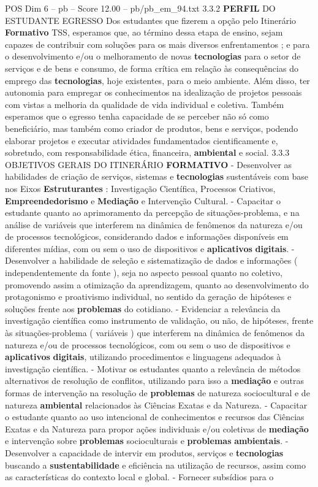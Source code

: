 \begin{textsample}{POS Dim 6 – pb – Score 12.00 – pb/pb\_em\_94.txt}  \label{ex:f6_pos_201}
3.3.2 \textbf{PERFIL} DO ESTUDANTE EGRESSO Dos estudantes que fizerem a opção pelo Itinerário \textbf{Formativo} TSS, esperamos que, ao término dessa etapa de ensino, sejam capazes de contribuir com soluções para os mais diversos enfrentamentos ; e para o desenvolvimento e/ou o melhoramento de novas \textbf{tecnologias} para o setor de serviços e de bens e consumo, de forma crítica em relação às consequências do emprego das \textbf{tecnologias}, hoje existentes, para o meio ambiente.
Além disso, ter autonomia para empregar os conhecimentos na idealização de projetos pessoais com vistas a melhoria da qualidade de vida individual e coletiva.
Também esperamos que o egresso tenha capacidade de se perceber não só como beneficiário, mas também como criador de produtos, bens e serviços, podendo elaborar projetos e executar atividades fundamentados cientificamente e, sobretudo, com responsabilidade ética, financeira, \textbf{ambiental} e social. 3.3.3 OBJETIVOS GERAIS DO ITINERÁRIO \textbf{FORMATIVO} - Desenvolver as habilidades de criação de serviços, sistemas e \textbf{tecnologias} sustentáveis com base nos Eixos \textbf{Estruturantes} : Investigação Científica, Processos Criativos, \textbf{Empreendedorismo} e \textbf{Mediação} e Intervenção Cultural. - Capacitar o estudante quanto ao aprimoramento da percepção de situações-problema, e na análise de variáveis que interferem na dinâmica de fenômenos da natureza e/ou de processos tecnológicos, considerando dados e informações disponíveis em diferentes mídias, com ou sem o uso de dispositivos e \textbf{aplicativos} \textbf{digitais}. - Desenvolver a habilidade de seleção e sistematização de dados e informações ( independentemente da fonte ), seja no aspecto pessoal quanto no coletivo, promovendo assim a otimização da aprendizagem, quanto ao desenvolvimento do protagonismo e proativismo individual, no sentido da geração de hipóteses e soluções frente aos \textbf{problemas} do cotidiano. - Evidenciar a relevância da investigação científica como instrumento de validação, ou não, de hipóteses, frente às situações-problema ( variáveis ) que interferem na dinâmica de fenômenos da natureza e/ou de processos tecnológicos, com ou sem o uso de dispositivos e \textbf{aplicativos} \textbf{digitais}, utilizando procedimentos e linguagens adequados à investigação científica. - Motivar os estudantes quanto a relevância de métodos alternativos de resolução de conflitos, utilizando para isso a \textbf{mediação} e outras formas de intervenção na resolução de \textbf{problemas} de natureza sociocultural e de natureza \textbf{ambiental} relacionados às Ciências Exatas e da Natureza. - Capacitar o estudante quanto ao uso intencional de conhecimentos e recursos das Ciências Exatas e da Natureza para propor ações individuais e/ou coletivas de \textbf{mediação} e intervenção sobre \textbf{problemas} socioculturais e \textbf{problemas} \textbf{ambientais}. - Desenvolver a capacidade de intervir em produtos, serviços e \textbf{tecnologias} buscando a \textbf{sustentabilidade} e eficiência na utilização de recursos, assim como as características do contexto local e global. - Fornecer subsídios para o 
\end{textsample}
